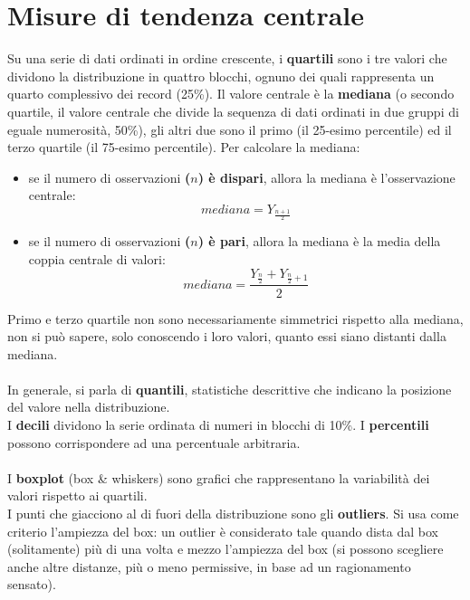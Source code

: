 \documentclass[10pt, draft]{book}
\begin{document}
\section{Misure di tendenza centrale}
Su una serie di dati ordinati in ordine crescente, i \textbf{quartili} sono i tre valori che dividono la distribuzione in quattro blocchi, ognuno dei quali rappresenta un quarto complessivo dei record (25\%). Il valore centrale è la \textbf{mediana} (o secondo quartile, il valore centrale che divide la sequenza di dati ordinati in due gruppi di eguale numerosità, 50\%), gli altri due sono il primo (il 25-esimo percentile) ed il terzo quartile (il 75-esimo percentile).
Per calcolare la mediana:
\begin{itemize}
    \item se il numero di osservazioni \textbf{($n$) è dispari}, allora la mediana è l'osservazione centrale:
    \begin{equation}
        mediana = Y_{\frac{n+1}{2}}
    \end{equation}
    \item se il numero di osservazioni \textbf{($n$) è pari}, allora la mediana è la media della coppia centrale di valori:
    \begin{equation}
        mediana = \frac{Y_{\frac{n}{2}} + Y_{\frac{n}{2}+1}}{2}
    \end{equation}
\end{itemize}
Primo e terzo quartile non sono necessariamente simmetrici rispetto alla mediana, non si può sapere, solo conoscendo i loro valori, quanto essi siano distanti dalla mediana.
\\
\\
In generale, si parla di \textbf{quantili}, statistiche descrittive che indicano la posizione del valore nella distribuzione.
\\
I \textbf{decili} dividono la serie ordinata di numeri in blocchi di 10\%.
I \textbf{percentili} possono corrispondere ad una percentuale arbitraria.
\\
\\
I \textbf{boxplot} (box \& whiskers) sono grafici che rappresentano la variabilità dei valori rispetto ai quartili.
\\
I punti che giacciono al di fuori della distribuzione sono gli \textbf{outliers}. Si usa come criterio l’ampiezza del box: un outlier è considerato tale quando dista dal box (solitamente) più di una volta e mezzo l’ampiezza del box (si possono scegliere anche altre distanze, più o meno permissive, in base ad un ragionamento sensato).
\end{document}
